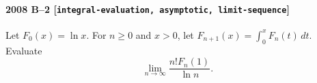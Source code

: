 \paragraph{2008 B--2 \textnormal{[\texttt{integral-evaluation, asymptotic, limit-sequence}]}}
Let $F_0(x) = \ln x$. For $n \geq 0$ and $x > 0$, let
$F_{n+1}(x) = \int_0^x F_n(t)\,dt$. Evaluate
\[
\lim_{n \to \infty} \frac{n! F_n(1)}{\ln n}.
\]
